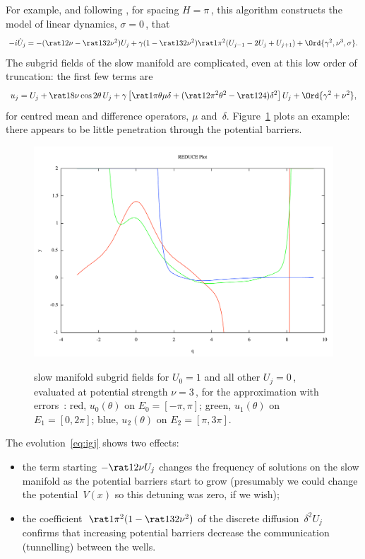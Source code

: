 \documentclass[12pt,a5paper]{article}
\begin{document}
For example, and following \cite{Alfimov2002}, for spacing \(H=\pi\)\,, this algorithm constructs the model of linear dynamics, \(\sigma=0\)\,, that
\begin{equation}
-i\dot U_j=-(\rat12\nu-\rat1{32}\nu^2)U_j
+\gamma(1-\rat1{32}\nu^2)\rat1{\pi^2}(U_{j-1}-2U_j+U_{j+1})
+\Ord{\gamma^2,\nu^3,\sigma}.
\label{eq:igj}
\end{equation}
The subgrid fields of the slow manifold are complicated, even at this low order of truncation: the first few terms are
\begin{equation}
u_j = U_j +\rat18\nu\cos2\theta\,U_j
+\gamma\left[\rat1\pi\theta\mu\delta+(\rat1{2\pi^2}\theta^2-\rat1{24})\delta^2\right]U_j
+\Ord{\gamma^2+\nu^2},
\label{eq:uj}
\end{equation}
for centred mean and difference operators, \(\mu\) and~\(\delta\).
Figure~\ref{fig:subgrid} plots an example: 
there appears to be little penetration through the potential barriers.

\begin{figure}
\centering
\includegraphics[width=\linewidth]{subgrid}\\
\caption{slow manifold subgrid fields for \(U_0=1\) and all other \(U_j=0\)\,, evaluated at potential strength \(\nu=3\)\,, for the approximation with errors~: 
red, \(u_0(\theta)\) on \(E_0=[-\pi,\pi]\);
green, \(u_1(\theta)\) on \(E_1=[0,2\pi]\);
blue, \(u_2(\theta)\) on \(E_2=[\pi,3\pi]\).}
\label{fig:subgrid}
\end{figure}

The evolution~\eqref{eq:igj} shows two effects:
\begin{itemize}
\item the term starting \(-\rat12\nu U_j\) changes the frequency of solutions on the slow manifold as the potential barriers start to grow (presumably we could change the potential~\(V(x)\) so this detuning was zero, if we wish);
\item  the coefficient~\(\rat1{\pi^2}(1-\rat1{32}\nu^2)\) of the discrete diffusion~\(\delta^2U_j\) confirms that increasing potential barriers decrease the communication (tunnelling) between the wells.
\end{itemize}
\end{document}
